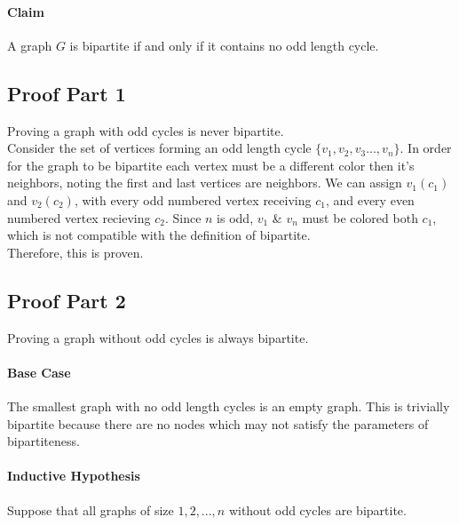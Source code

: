 \documentclass[12pt]{article}
\begin{document}
\paragraph{Claim}
A graph $G$ is bipartite if and only if it contains no odd length cycle.

\subsection{Proof Part 1}
Proving a graph with odd cycles is never bipartite. \\
Consider the set of vertices forming an odd length cycle $\{v_1, v_2, v_3...,v_n\}$. In order for the graph to be bipartite each vertex must be a different color then it's neighbors, noting the first and last vertices are neighbors. We can assign $v_1(c_1)$ and $v_2(c_2)$, with every odd numbered vertex receiving $c_1$, and every even numbered vertex recieving $c_2$. Since $n$ is odd, $v_1$ \& $v_n$ must be colored both $c_1$, which is not compatible with the definition of bipartite. \\
Therefore, this is proven.

\subsection{Proof Part 2}
Proving a graph without odd cycles is always bipartite.
\paragraph{Base Case}
The smallest graph with no odd length cycles is an empty graph. This is trivially bipartite because there are no nodes which may not satisfy the parameters of bipartiteness.

\paragraph{Inductive Hypothesis}
Suppose that all graphs of size ${1, 2,..., n}$ without odd cycles are bipartite.
\end{document}
